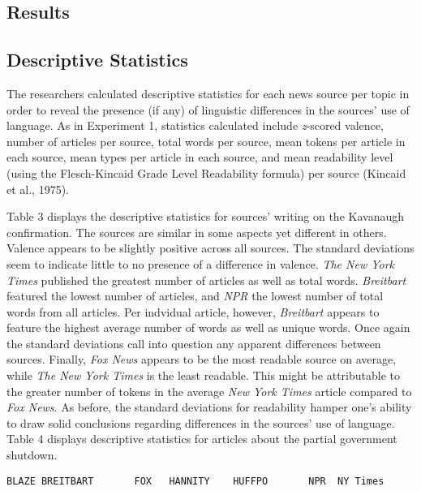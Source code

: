 \documentclass[english,,man]{apa6}
\begin{document}
\hypertarget{results-1}{%
\subsection{Results}\label{results-1}}

\hypertarget{descriptive-statistics-1}{%
\subsection{Descriptive Statistics}\label{descriptive-statistics-1}}

The researchers calculated descriptive statistics for each news source per topic in order to reveal the presence (if any) of linguistic differences in the sources' use of language. As in Experiment 1, statistics calculated include \emph{z}-scored valence, number of articles per source, total words per source, mean tokens per article in each source, mean types per article in each source, and mean readability level (using the Flesch-Kincaid Grade Level Readability formula) per source (Kincaid et al., 1975).

Table 3 displays the descriptive statistics for sources' writing on the Kavanaugh confirmation. The sources are similar in some aspects yet different in others. Valence appears to be slightly positive across all sources. The standard deviations seem to indicate little to no presence of a difference in valence.
\emph{The New York Times} published the greatest number of articles as well as total words. \emph{Breitbart} featured the lowest number of articles, and \emph{NPR} the lowest number of total words from all articles. Per indvidual article, however, \emph{Breitbart} appears to feature the highest average number of words as well as unique words. Once again the standard deviations call into question any apparent differences between sources. Finally, \emph{Fox News} appears to be the most readable source on average, while \emph{The New York Times} is the least readable. This might be attributable to the greater number of tokens in the average \emph{New York Times} article compared to \emph{Fox News}. As before, the standard deviations for readability hamper one's ability to draw solid conclusions regarding differences in the sources' use of language. Table 4 displays descriptive statistics for articles about the partial government shutdown.

\begin{verbatim}
BLAZE BREITBART       FOX   HANNITY    HUFFPO       NPR  NY Times 
\end{verbatim}
\end{document}
